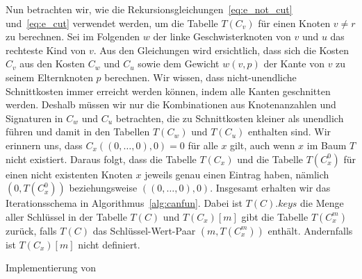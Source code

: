 Nun betrachten wir, wie die Rekursionsgleichungen~\eqref{eq:e_not_cut} und~\eqref{eq:e_cut} verwendet werden, um die Tabelle $T(C_v)$ für einen Knoten $v \neq r$ zu berechnen.
Sei im Folgenden $w$ der linke Geschwisterknoten von $v$ und $u$ das rechteste Kind von $v$.
Aus den Gleichungen wird ersichtlich, dass sich die Kosten $C_v$ aus den Kosten $C_w$ und $C_u$ sowie dem Gewicht $w(v, p)$ der Kante von $v$ zu seinem Elternknoten $p$ berechnen.
Wir wissen, dass nicht-unendliche Schnittkosten immer erreicht werden können, indem alle Kanten geschnitten werden.
Deshalb müssen wir nur die Kombinationen aus Knotenanzahlen und Signaturen in $C_w$ und $C_u$ betrachten, die zu Schnittkosten kleiner als unendlich führen und damit in den Tabellen $T(C_w)$ und $T(C_u)$ enthalten sind.
Wir erinnern uns, dass $C_x((0,\ldots, 0),0) = 0$ für alle $x$ gilt, auch wenn $x$ im Baum $T$ nicht existiert.
Daraus folgt, dass die Tabelle $T(C_x)$ und die Tabelle $T(C^0_x)$ für einen nicht existenten Knoten $x$ jeweils genau einen Eintrag haben, nämlich $(0, T(C^0_x))$ beziehungsweise $((0,\ldots,0), 0)$.
Insgesamt erhalten wir das Iterationsschema in Algorithmus~\ref{alg:canfun}.
Dabei ist $T(C).keys$ die Menge aller Schlüssel in der Tabelle $T(C)$ und $T(C_x)[m]$ gibt die Tabelle $T(C^m_x)$ zurück, falls $T(C)$ das Schlüssel-Wert-Paar $(m, T(C^m_x))$ enthält.
Andernfalls ist $T(C_x)[m]$ nicht definiert.

\begin{algorithm}
    \caption{Implementierung von \canfun{}}\label{alg:canfun}
    \begin{algorithmic}[1]
                        \State {}
                        \State {}
                    \EndFor
                \EndFor
            \EndFor
        \EndFor
        \EndFunction
    \end{algorithmic}
\end{algorithm}

\newcommand{\encfun}{\textproc{edge\_not\_cut}}
\newcommand{\ecfun}{\textproc{edge\_cut}}

